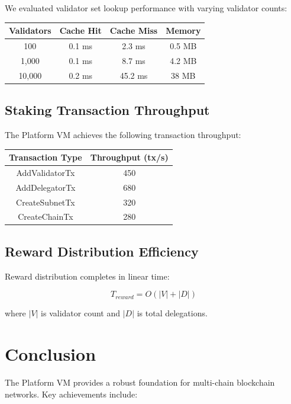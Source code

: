\documentclass[11pt,letterpaper]{article}
\begin{document}
We evaluated validator set lookup performance with varying validator counts:

\begin{center}
\begin{tabular}{|c|c|c|c|}
\hline
\textbf{Validators} & \textbf{Cache Hit} & \textbf{Cache Miss} & \textbf{Memory} \\
\hline
100 & 0.1 ms & 2.3 ms & 0.5 MB \\
1,000 & 0.1 ms & 8.7 ms & 4.2 MB \\
10,000 & 0.2 ms & 45.2 ms & 38 MB \\
\hline
\end{tabular}
\end{center}

\subsection{Staking Transaction Throughput}

The Platform VM achieves the following transaction throughput:

\begin{center}
\begin{tabular}{|c|c|}
\hline
\textbf{Transaction Type} & \textbf{Throughput (tx/s)} \\
\hline
AddValidatorTx & 450 \\
AddDelegatorTx & 680 \\
CreateSubnetTx & 320 \\
CreateChainTx & 280 \\
\hline
\end{tabular}
\end{center}

\subsection{Reward Distribution Efficiency}

Reward distribution completes in linear time:

\begin{equation}
T_{reward} = O(|V| + |D|)
\end{equation}

where $|V|$ is validator count and $|D|$ is total delegations.

\section{Conclusion}

The Platform VM provides a robust foundation for multi-chain blockchain networks. Key achievements include:
\end{document}
